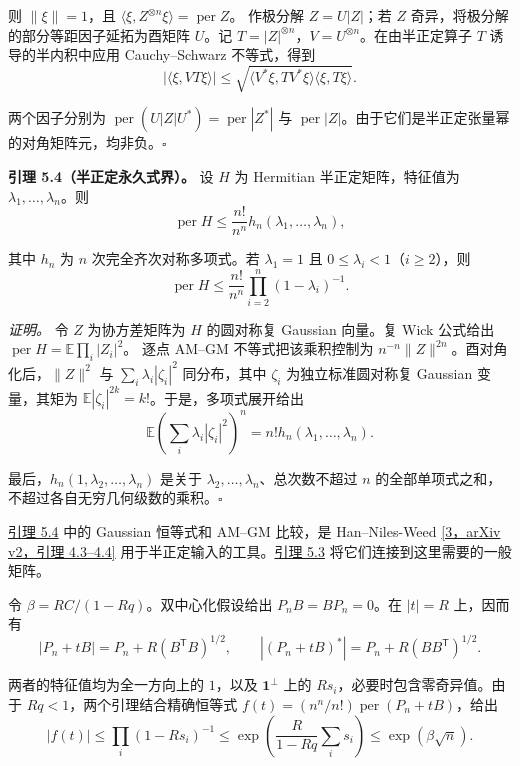 \documentclass[11pt,a4paper]{article}
\makeatletter
\newcommand{\paperstatement}[3]{\par\addvspace{6pt}\Needspace{4\baselineskip}\phantomsection\def\@currentlabel{#2}\label{#3}\noindent\textbf{#1}\enspace}
\newcommand{\paperref}[2]{\hyperref[#1]{#2}}
\makeatother
\begin{document}
则 \(\|\xi\|=1\)，且 \(\langle\xi,Z^{\otimes n}\xi\rangle=\operatorname{per}Z\)。 作极分解 \(Z=U|Z|\)；若 \(Z\) 奇异，将极分解的部分等距因子延拓为酉矩阵 \(U\)。记 \(T=|Z|^{\otimes n}\)，\(V=U^{\otimes n}\)。在由半正定算子 \(T\) 诱导的半内积中应用 Cauchy--Schwarz 不等式，得到
\[|\langle\xi,VT\xi\rangle|
\le\sqrt{\langle V^*\xi,TV^*\xi\rangle
\langle\xi,T\xi\rangle}.\]

两个因子分别为 \(\operatorname{per}(U|Z|U^*)=\operatorname{per}|Z^*|\) 与 \(\operatorname{per}|Z|\)。由于它们是半正定张量幂的对角矩阵元，均非负。\nobreak\hspace{.5em}\mbox{$\square$}

\paperstatement{引理 5.4（半正定永久式界）。}{5.4}{thm-5.4} 设 \(H\) 为 Hermitian 半正定矩阵，特征值为 \(\lambda_1,\ldots,\lambda_n\)。则
\[\operatorname{per}H\le\frac{n!}{n^n}h_n(\lambda_1,\ldots,\lambda_n),\]

其中 \(h_n\) 为 \(n\) 次完全齐次对称多项式。若 \(\lambda_1=1\) 且 \(0\le\lambda_i<1\)（\(i\ge2\)），则
\[\operatorname{per}H\le\frac{n!}{n^n}
\prod_{i=2}^n(1-\lambda_i)^{-1}.\]

\emph{证明。} 令 \(Z\) 为协方差矩阵为 \(H\) 的圆对称复 Gaussian 向量。复 Wick 公式给出 \(\operatorname{per}H=\mathbb E\prod_i|Z_i|^2\)。 逐点 AM--GM 不等式把该乘积控制为 \(n^{-n}\|Z\|^{2n}\)。酉对角化后，\(\|Z\|^2\) 与 \(\sum_i\lambda_i|\zeta_i|^2\) 同分布，其中 \(\zeta_i\) 为独立标准圆对称复 Gaussian 变量，其矩为 \(\mathbb E|\zeta_i|^{2k}=k!\)。于是，多项式展开给出
\[\mathbb E\left(\sum_i\lambda_i|\zeta_i|^2\right)^n
=n!h_n(\lambda_1,\ldots,\lambda_n).\]

最后，\(h_n(1,\lambda_2,\ldots,\lambda_n)\) 是关于 \(\lambda_2,\ldots,\lambda_n\)、总次数不超过 \(n\) 的全部单项式之和，不超过各自无穷几何级数的乘积。\nobreak\hspace{.5em}\mbox{$\square$}

\paperref{thm-5.4}{引理 5.4} 中的 Gaussian 恒等式和 AM--GM 比较，是 Han--Niles-Weed \paperref{bib-3}{[3，arXiv v2，引理 4.3–4.4]} 用于半正定输入的工具。\paperref{thm-5.3}{引理 5.3} 将它们连接到这里需要的一般矩阵。

令 \(\beta=RC/(1-Rq)\)。双中心化假设给出 \(P_nB=BP_n=0\)。在 \(|t|=R\) 上，因而有
\[|P_n+tB|=P_n+R(B^{\mathsf T}B)^{1/2},
\qquad
|(P_n+tB)^*|=P_n+R(BB^{\mathsf T})^{1/2}.\]

两者的特征值均为全一方向上的 \(1\)，以及 \(\mathbf1^\perp\) 上的 \(Rs_i\)，必要时包含零奇异值。由于 \(Rq<1\)，两个引理结合精确恒等式 \(f(t)=(n^n/n!)\operatorname{per}(P_n+tB)\)，给出
\[|f(t)|\le\prod_i(1-Rs_i)^{-1}
\le\exp\!\left(\frac{R}{1-Rq}\sum_i s_i\right)
\le\exp(\beta\sqrt n).\]
\end{document}

